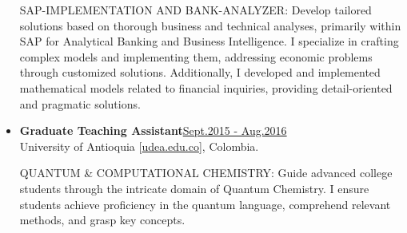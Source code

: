 \begin{itemize}
              {\noindent
                  \uppercase{SAP-Implementation and Bank-Analyzer:}
                  Develop tailored solutions based on thorough business and technical analyses, primarily within SAP for Analytical Banking and Business Intelligence. I specialize in crafting complex models and implementing them, addressing economic problems through customized solutions. Additionally, I developed and implemented mathematical models related to financial inquiries, providing detail-oriented and pragmatic solutions.
              }

    \item {\bf Graduate Teaching Assistant}\hfill \href{.}{Sept.2015 - Aug.2016}\\
          University of Antioquia [\href{www.udea.edu.co}{udea.edu.co}],
          Colombia.

              {\noindent
                  \uppercase{Quantum \& Computational Chemistry:}
                  Guide advanced college students through the intricate domain of Quantum Chemistry. I ensure students achieve proficiency in the quantum language, comprehend relevant methods, and grasp key concepts. %
              }

\end{itemize}
